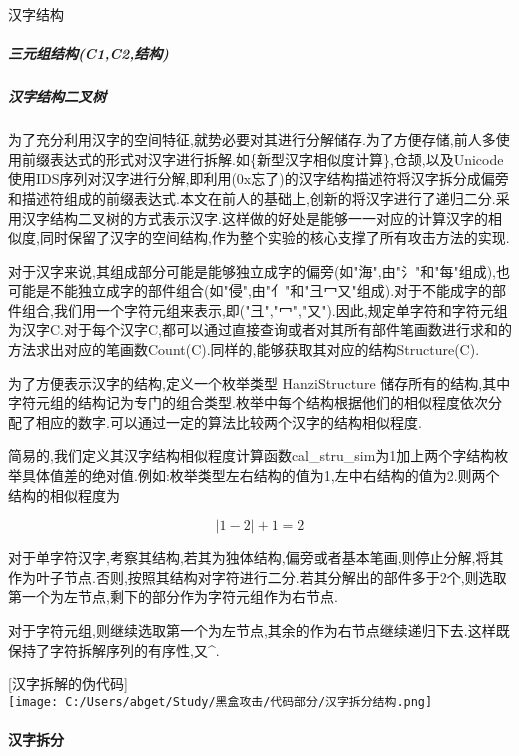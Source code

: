 \documentclass[
]{article}
\begin{document}
汉字结构

\hypertarget{ux4e09ux5143ux7ec4ux7ed3ux6784c1c2ux7ed3ux6784}{%
\subparagraph{三元组结构(C1,C2,结构)}\label{ux4e09ux5143ux7ec4ux7ed3ux6784c1c2ux7ed3ux6784}}

\hypertarget{ux6c49ux5b57ux7ed3ux6784ux4e8cux53c9ux6811}{%
\subparagraph{汉字结构二叉树}\label{ux6c49ux5b57ux7ed3ux6784ux4e8cux53c9ux6811}}

为了充分利用汉字的空间特征,就势必要对其进行分解储存.为了方便存储,前人多使用前缀表达式的形式对汉字进行拆解.如\{新型汉字相似度计算\},仓颉,以及Unicode使用IDS序列对汉字进行分解,即利用(0x忘了)的汉字结构描述符将汉字拆分成偏旁和描述符组成的前缀表达式.本文在前人的基础上,创新的将汉字进行了递归二分.采用汉字结构二叉树的方式表示汉字.这样做的好处是能够一一对应的计算汉字的相似度,同时保留了汉字的空间结构,作为整个实验的核心支撑了所有攻击方法的实现.

对于汉字来说,其组成部分可能是能够独立成字的偏旁(如"海",由"⺡"和"每"组成),也可能是不能独立成字的部件组合(如"侵",由"亻"和"彐冖又"组成).对于不能成字的部件组合,我们用一个字符元组来表示,即("彐","冖","又").因此,规定单字符和字符元组为汉字C.对于每个汉字C,都可以通过直接查询或者对其所有部件笔画数进行求和的方法求出对应的笔画数Count(C).同样的,能够获取其对应的结构Structure(C).

为了方便表示汉字的结构,定义一个枚举类型 HanziStructure
储存所有的结构,其中字符元组的结构记为专门的组合类型.枚举中每个结构根据他们的相似程度依次分配了相应的数字.可以通过一定的算法比较两个汉字的结构相似程度.

简易的,我们定义其汉字结构相似程度计算函数cal\_stru\_sim为1加上两个字结构枚举具体值差的绝对值.例如:枚举类型左右结构的值为1,左中右结构的值为2.则两个结构的相似程度为

\[\left |1-2  \right |+1=2\]

对于单字符汉字,考察其结构,若其为独体结构,偏旁或者基本笔画,则停止分解,将其作为叶子节点.否则,按照其结构对字符进行二分.若其分解出的部件多于2个,则选取第一个为左节点,剩下的部分作为字符元组作为右节点.

对于字符元组,则继续选取第一个为左节点,其余的作为右节点继续递归下去.这样既保持了字符拆解序列的有序性,又\^{}.

{[}汉字拆解的伪代码{]}\\
\texttt{[image: C:/Users/abget/Study/黑盒攻击/代码部分/汉字拆分结构.png]}

\hypertarget{ux6c49ux5b57ux62c6ux5206}{%
\paragraph{汉字拆分}\label{ux6c49ux5b57ux62c6ux5206}}
\end{document}
